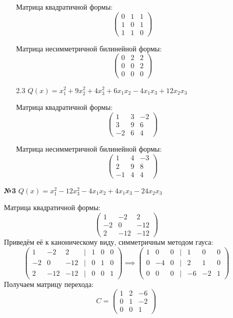 \documentclass[a4paper]{article}
\newcommand{\mat}[1]{\begin{pmatrix} #1 \end{pmatrix}}
\begin{document}
\begin{enumerate}
\begin{enumerate}
        Матрица квадратичной формы:
        \[
        \begin{pmatrix}
        0 & 1 & 1 \\
        1 & 0 & 1 \\
        1 & 1 & 0
        \end{pmatrix}
        \]  

        Матрица несимметричной билинейной формы:
        \[
        \begin{pmatrix}
        0 & 2 & 2 \\
        0 & 0 & 2 \\
        0 & 0 & 0
        \end{pmatrix}
        \]

        \item[2.3]\( Q(x) = x_1^2 + 9x_2^2 + 4x_3^2 + 6x_1x_2 - 4x_1x_3 + 12x_2x_3 \)
        
        Матрица квадратичной формы:
        \[
        \begin{pmatrix}
        1 & 3 & -2 \\
        3 & 9 & 6 \\
        -2 & 6 & 4
        \end{pmatrix}
        \] 

        Матрица несимметричной билинейной формы:
        \[
        \begin{pmatrix}
        1 & 4 & -3 \\
        2 & 9 & 8 \\
        -1 & 4 & 4
        \end{pmatrix}
        \]
          
    \end{enumerate}

    \item[\textbf{№3}]$Q(x) = x_1^2-12x_3^2-4x_1x_2+4x_1x_3-24x_2x_3$
    
    Матрица квадратичной формы:
    $$\mat{
        1 & -2 & 2\\
        -2 & 0 & -12\\
        2 & -12 & -12
    }$$
    Приведём её к каноническому виду, симметричным методом гауса:
    $$\mat{
        1 & -2 & 2&| & 1 & 0 & 0\\
        -2 & 0 & -12 & | & 0 & 1 & 0\\
        2 & -12 & -12 & | & 0 & 0 & 1
    } \implies \mat{
        1 & 0 & 0&| & 1 & 0 & 0\\
        0 & -4 & 0 & | & 2 & 1 & 0\\
        0 & 0 & 0 & | & -6 & -2 & 1
    }$$
    Получаем матрицу перехода:
    $$C = \mat{
        1 & 2 & -6\\
        0  & 1 & -2\\
        0 & 0 & 1 
    }$$


\end{enumerate}
\end{document}
